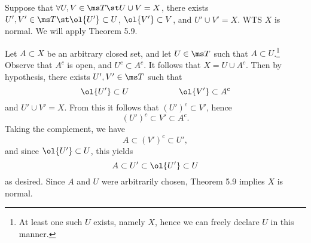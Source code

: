 \documentclass{fkpset}
\begin{document}
\begin{solution}[Solution 1:]
\begin{iffproof}
      \item Suppose that $\forall U,V \in \ms T \st U \cup V = X$,
        there exists $U', V' \in \ms T \st \ol{U'} \subset U$,
        $\ol{V'} \subset V$, and $U' \cup V' = X$. WTS $X$ is normal.
        We will apply Theorem 5.9.

        Let $A \subset X$ be an arbitrary closed set, and let $U \in
        \ms T$ such that $A \subset U$.\footnote{At least one such $U$
          exists, namely $X$, hence we can freely declare $U$ in this
          manner.} Observe that $A^c$ is open, and $U^c \subset A^c$.
        It follows that $X = U \cup A^c$. Then by hypothesis, there
        exists $U',V' \in \ms T$ such that
        \[
          \ol{U'} \subset U \qquad \qquad \qquad \ol{V'} \subset A^c
        \]
        and $U' \cup V' = X$. From this it follows that $(U')^c
        \subset V'$, hence
        \[
          (U')^c \subset V' \subset A^c.
        \]
        Taking the complement, we have
        \[
          A \subset (V')^c \subset U',
        \]
        and since $\ol{U'} \subset U$, this yields
        \[
          A \subset U' \subset \ol{U'} \subset U
        \]
        as desired. Since $A$ and $U$ were arbitrarily chosen, Theorem
        5.9 implies $X$ is normal. \cmark
    \end{iffproof}
  \end{solution}
  \hrulefill
\end{document}
